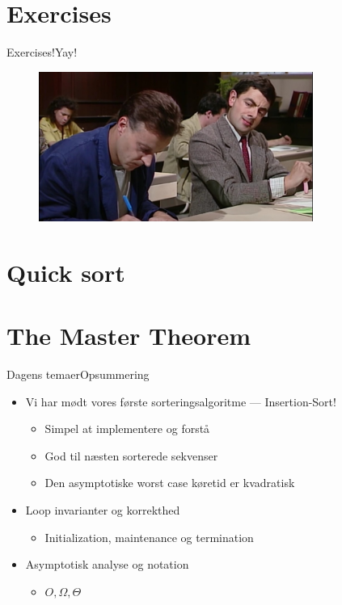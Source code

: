 \documentclass{beamer}
\begin{document}
\section{Exercises}

\begin{frame}{Exercises!}{Yay!}
    
    \begin{figure}[h]
        \centering
        \includegraphics[width=0.8\textwidth]{exercises}
    \end{figure}
    
\end{frame}


\section{Quick sort}
\section{The Master Theorem}

\begin{frame}{Dagens temaer}{Opsummering}
    \begin{itemize}
        \item Vi har mødt vores første sorteringsalgoritme --- Insertion-Sort!
            \begin{itemize}
                \item Simpel at implementere og forstå
                \item God til næsten sorterede sekvenser
                \item Den asymptotiske worst case køretid er kvadratisk
            \end{itemize}
        \item Loop invarianter og korrekthed
            \begin{itemize}
                \item Initialization, maintenance og termination
            \end{itemize}
        \item Asymptotisk analyse og notation
            \begin{itemize}
                \item $O, \Omega, \Theta$
            \end{itemize}
    \end{itemize}
\end{frame}
\end{document}
